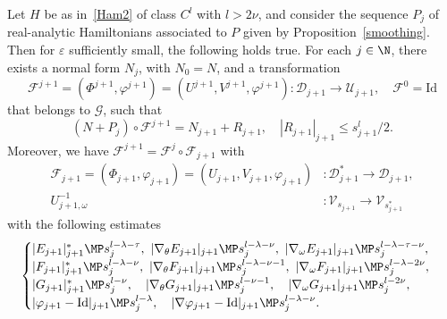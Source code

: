 \begin{proposition}\label{iterative}
Let $H$ be as in~\eqref{Ham2} of class $C^l$ with $l>2\nu$, and consider the sequence $P_j$ of real-analytic Hamiltonians associated to $P$ given by Proposition~\ref{smoothing}. Then for $\varepsilon$ sufficiently small, the following holds true. For each $j \in \N$, there exists a normal form $N_{j}$, with $N_0=N$, and a transformation
\begin{equation}\label{fhaut}
\mathcal{F}^{j+1}=(\Phi^{j+1},\varphi^{j+1})=(U^{j+1},V^{j+1},\varphi^{j+1}) : \mathcal{D}_{j+1} \to \mathcal{U}_{j+1}, \quad \mathcal{F}^0=\mathrm{Id}
\end{equation}
that belongs to $\mathcal{G}$, such that
\begin{equation}\label{estim1iter}
(N+P_j) \circ \mathcal{F}^{j+1}=N_{j+1}+R_{j+1}, \quad |R_{j+1}|_{j+1} \leq s_{j+1}^l/2.
\end{equation}
Moreover, we have $\mathcal{F}^{j+1}=\mathcal{F}^{j} \circ \mathcal{F}_{j+1}$ with
\begin{equation}\label{fbas}
\begin{split}
\mathcal{F}_{j+1}=(\Phi_{j+1},\varphi_{j+1})=(U_{j+1},V_{j+1},\varphi_{j+1}) &: \mathcal{D}_{j+1}^* \to \mathcal{D}_{j+1}, \\
U_{j+1,\omega}^{-1} &: \mathcal{V}_{s_{j+1}} \to \mathcal{V}_{s_{j+1}^*}
\end{split}
\end{equation}
with the following estimates
\begin{equation}\label{estim2iter}
\begin{cases}
|E_{j+1}|_{j+1}^* \MP s_j^{l-\lambda-\tau}, \ |\nabla_\theta E_{j+1}|_{j+1} \MP s_j^{l-\lambda-\nu}, \ |\nabla_\omega E_{j+1}|_{j+1} \MP s_j^{l-\lambda-\tau-\nu},\\
|F_{j+1}|_{j+1}^* \MP s_j^{l-\lambda-\nu}, \ |\nabla_\theta F_{j+1}|_{j+1} \MP s_j^{l-\lambda-\nu-1}, \ |\nabla_\omega F_{j+1}|_{j+1} \MP s_j^{l-\lambda-2\nu}, \\
|G_{j+1}|_{j+1}^* \MP s_j^{l-\nu}, \quad |\nabla_\theta G_{j+1}|_{j+1} \MP s_j^{l-\nu-1}, \quad |\nabla_\omega G_{j+1}|_{j+1} \MP s_j^{l-2\nu}, \\
|\varphi_{j+1}-\mathrm{Id}|_{j+1} \MP s_j^{l-\lambda}, \quad |\nabla \varphi_{j+1}-\mathrm{Id}|_{j+1} \MP s_j^{l-\lambda-\nu}.
\end{cases}
\end{equation}
\end{proposition}

